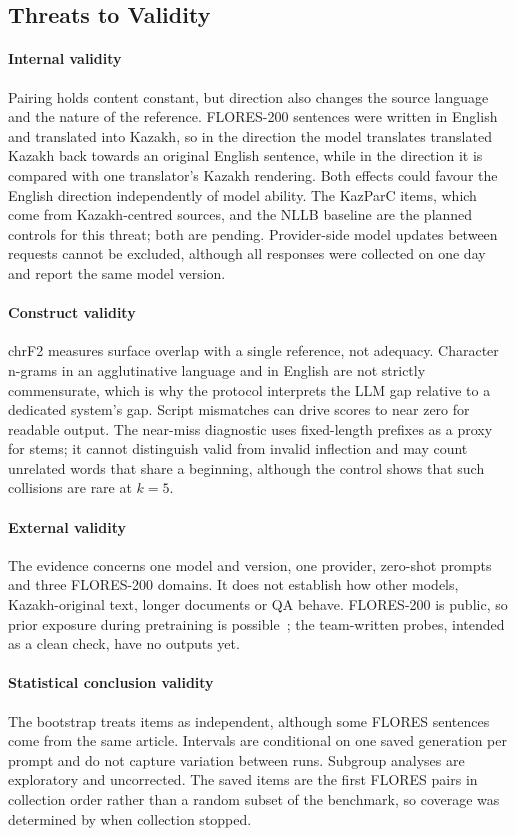 \subsection{Threats to Validity}
\paragraph*{Internal validity} Pairing holds content constant, but direction also changes the source language and the nature of the reference. FLORES-200 sentences were written in English and translated into Kazakh, so in the \KKEN{} direction the model translates translated Kazakh back towards an original English sentence, while in the \ENKK{} direction it is compared with one translator's Kazakh rendering. Both effects could favour the English direction independently of model ability. The KazParC items, which come from Kazakh-centred sources, and the NLLB baseline are the planned controls for this threat; both are pending. Provider-side model updates between requests cannot be excluded, although all responses were collected on one day and report the same model version.

\paragraph*{Construct validity} chrF2 measures surface overlap with a single reference, not adequacy. Character n-grams in an agglutinative language and in English are not strictly commensurate, which is why the protocol interprets the LLM gap relative to a dedicated system's gap. Script mismatches can drive scores to near zero for readable output. The near-miss diagnostic uses fixed-length prefixes as a proxy for stems; it cannot distinguish valid from invalid inflection and may count unrelated words that share a beginning, although the control shows that such collisions are rare at $k=5$.

\paragraph*{External validity} The evidence concerns one model and version, one provider, zero-shot prompts and three FLORES-200 domains. It does not establish how other models, Kazakh-original text, longer documents or QA behave. FLORES-200 is public, so prior exposure during pretraining is possible~\cite{sainz2023contamination}; the team-written probes, intended as a clean check, have no outputs yet.

\paragraph*{Statistical conclusion validity} The bootstrap treats items as independent, although some FLORES sentences come from the same article. Intervals are conditional on one saved generation per prompt and do not capture variation between runs. Subgroup analyses are exploratory and uncorrected. The saved items are the first \NPairs{} FLORES pairs in collection order rather than a random subset of the benchmark, so coverage was determined by when collection stopped.

